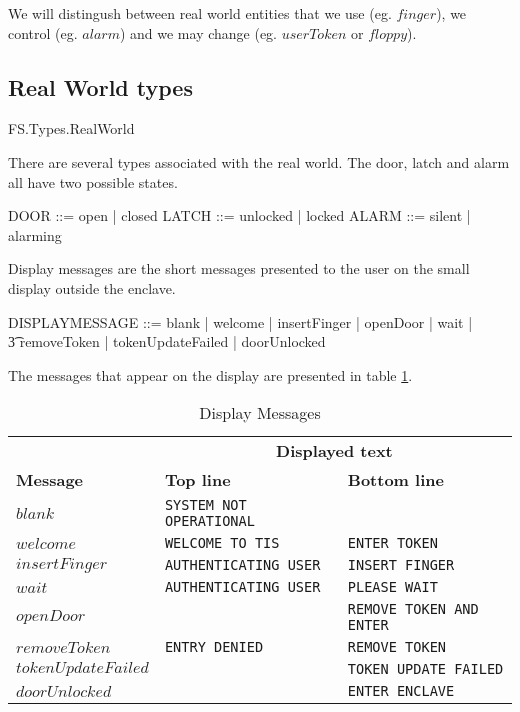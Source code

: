 We will distingush between real world entities that we use
 (eg. $finger$), we control (eg. $alarm$) 
 and we may change (eg. $userToken$ or $floppy$).


\subsection{Real World types}

\begin{traceunit}{FS.Types.RealWorld}
\end{traceunit}


There are several types associated with the real world. The door,
latch and alarm all have two possible states.
\begin{zed}
	DOOR ::= open | closed
\also
	LATCH ::= unlocked | locked
\also
	ALARM ::= silent | alarming
\end{zed}

Display messages are the short messages presented to the user on the
small display outside the enclave.
\begin{zed}
	DISPLAYMESSAGE ::= blank | welcome | insertFinger | openDoor |
                        wait | 
\\      \t3  removeToken | tokenUpdateFailed | doorUnlocked
\end{zed}

The messages that appear on the display are presented in table \ref{table:display}.

\begin{table}[h]
\begin{tabular}{|l|l|l|}
                & \multicolumn{2}{c|}{\bf Displayed text} \\ \cline{2-3}
{\bf Message}   & {\bf Top line}                & {\bf Bottom line}     \\
\hline
$blank$         & {\tt SYSTEM NOT OPERATIONAL}  & \\
$welcome$       & {\tt WELCOME TO TIS}          & {\tt ENTER TOKEN}  \\
$insertFinger$  & {\tt AUTHENTICATING USER}     & {\tt INSERT FINGER} \\ 
$wait$          & {\tt AUTHENTICATING USER}     & {\tt PLEASE WAIT} \\
$openDoor$      & {\tt }                        & {\tt REMOVE TOKEN AND ENTER} \\
$removeToken$   & {\tt ENTRY DENIED}            & {\tt REMOVE TOKEN} \\
$tokenUpdateFailed$ &                   & {\tt TOKEN UPDATE FAILED }
\\
$doorUnlocked$  &                       & {\tt ENTER ENCLAVE} \\
\hline
\end{tabular}
\caption{Display Messages}
\label{table:display}
\end{table}


